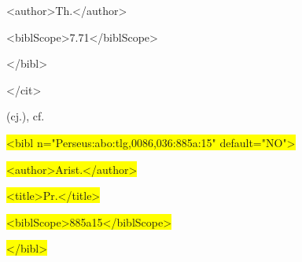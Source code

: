 \documentclass[10pt]{article}
\begin{document}
\begin{adjustwidth}{1.12in}{0.0in}
 <author>Th.</author>\par

\end{adjustwidth}

\begin{adjustwidth}{1.12in}{0.0in}
 <biblScope>7.71</biblScope>\par

\end{adjustwidth}

\begin{adjustwidth}{0.99in}{0.0in}
 </bibl>\par

\end{adjustwidth}

\begin{adjustwidth}{0.85in}{0.0in}
 </cit>\par

\end{adjustwidth}

\begin{adjustwidth}{0.85in}{0.0in}
 (cj.), cf.\par

\end{adjustwidth}

\begin{adjustwidth}{0.85in}{0.0in}
 \colorbox{Yellow}{<bibl n="Perseus:abo:tlg,0086,036:885a:15" default="NO">}\par

\end{adjustwidth}

\begin{adjustwidth}{0.99in}{0.0in}
 \colorbox{Yellow}{<author>Arist.</author>}\par

\end{adjustwidth}

\begin{adjustwidth}{0.99in}{0.0in}
 \colorbox{Yellow}{<title>Pr.</title>}\par

\end{adjustwidth}

\begin{adjustwidth}{0.99in}{0.0in}
 \colorbox{Yellow}{<biblScope>885a15</biblScope>}\par

\end{adjustwidth}

\begin{adjustwidth}{0.85in}{0.0in}
 \colorbox{Yellow}{</bibl>}\par

\end{adjustwidth}























\setlength{\parskip}{15.0pt}

\printbibliography
\end{document}
